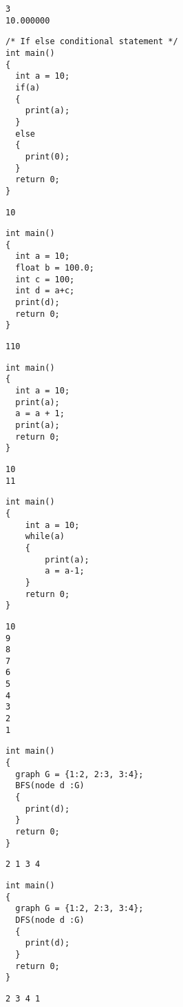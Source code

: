 \documentclass[english,a4paper,12pt]{report}
\begin{document}
\begin{lstlisting}
3 
10.000000
\end{lstlisting}
\begin{lstlisting}[style=CStyle]
/* If else conditional statement */
int main()
{
  int a = 10;
  if(a)
  {
    print(a);
  }
  else
  {
    print(0);
  }
  return 0;
}
\end{lstlisting}

\begin{lstlisting}
10
\end{lstlisting}
\begin{lstlisting}[style=CStyle]
int main()
{
  int a = 10;
  float b = 100.0;
  int c = 100;
  int d = a+c;
  print(d);
  return 0;
}
\end{lstlisting}

\begin{lstlisting}
110
\end{lstlisting}
\begin{lstlisting}[style=CStyle]
int main()
{
  int a = 10;
  print(a);
  a = a + 1;
  print(a);
  return 0;
}
\end{lstlisting}

\begin{lstlisting}
10 
11
\end{lstlisting}
\begin{lstlisting}[style=CStyle]
int main()
{
    int a = 10;
    while(a)
    {
        print(a);
        a = a-1;
    }
    return 0;
}
\end{lstlisting}

\begin{lstlisting}
10 
9 
8 
7 
6 
5 
4 
3 
2 
1
\end{lstlisting}

\begin{lstlisting}[style=CStyle]
int main()
{
  graph G = {1:2, 2:3, 3:4};
  BFS(node d :G)
  {
    print(d);
  }
  return 0;
}
\end{lstlisting}

\begin{lstlisting}
2 1 3 4
\end{lstlisting}

\begin{lstlisting}[style=CStyle]
int main()
{
  graph G = {1:2, 2:3, 3:4};
  DFS(node d :G)
  {
    print(d);
  }
  return 0;
}
\end{lstlisting}

\begin{lstlisting}
2 3 4 1
\end{lstlisting}
\end{document}
